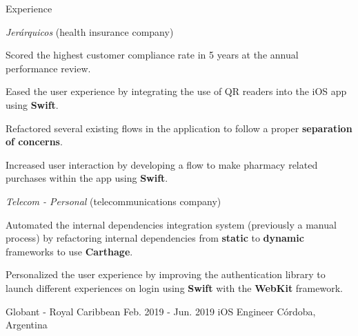 \documentclass{curriculum}
\begin{document}
\begin{cvsection}{Experience}
\begin{sectionitemlist}
        \item{\textit{Jerárquicos} (health insurance company)}
            \begin{sectionitemlist}
            \item{
                Scored the highest customer compliance rate
                in 5 years at the annual performance review.
            }
            \item{
                Eased the user experience by integrating the use of
                QR readers into the iOS app using \textbf{Swift}.
            }
            \item{
                Refactored several existing flows in the application
                to follow a proper \textbf{separation of concerns}.
            }
            \item {
                Increased user interaction by developing a flow to make pharmacy
                related purchases within the app using \textbf{Swift}.
            }
            \end{sectionitemlist}

        \item{\textit{Telecom - Personal} (telecommunications company)}
            \begin{sectionitemlist}
            \item{
                Automated the internal dependencies integration system
                (previously a manual process) by refactoring internal dependencies
                from \textbf{static} to \textbf{dynamic} frameworks to use \textbf{Carthage}.
            }
            \item{
                Personalized the user experience by improving the authentication
                library to launch different experiences on login using
                \textbf{Swift} with the \textbf{WebKit} framework.
            }
            \end{sectionitemlist}

        \end{sectionitemlist}


    \makesectionitemheader
        {Globant - Royal Caribbean}                         {Feb. 2019 - Jun. 2019}
        {iOS Engineer}                                         {Córdoba, Argentina}


\end{cvsection}
\end{document}
